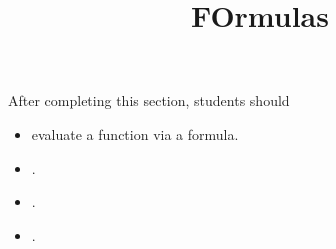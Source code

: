 \documentclass{ximera}
\title{FOrmulas}
\begin{document}
\begin{abstract}
\end{abstract}
\maketitle

\begin{sectionOutcomes}
After completing this section, students should 

\begin{itemize}
\item evaluate a function via a formula.
\item .
\item .
\item .
\end{itemize}
\end{sectionOutcomes}
\end{document}
